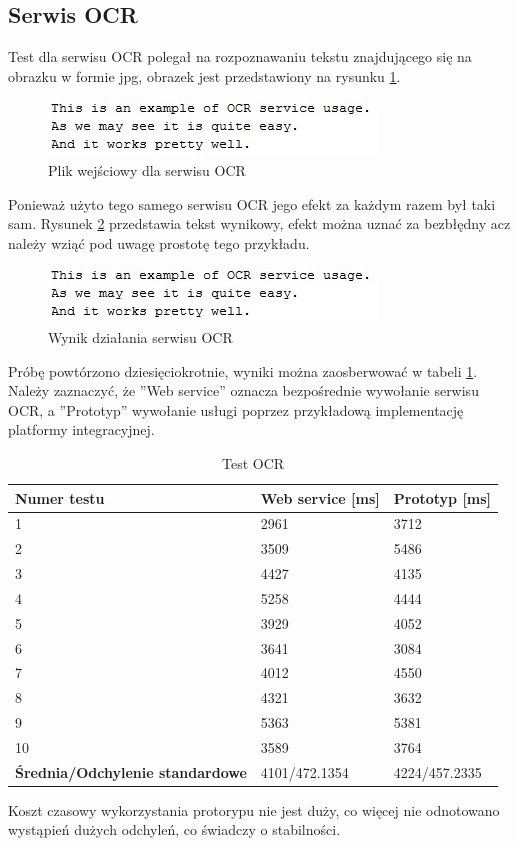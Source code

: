 \subsection{Serwis OCR}
Test dla serwisu OCR polegał na rozpoznawaniu tekstu znajdującego się na obrazku w formie jpg, obrazek jest przedstawiony na rysunku \ref{fig:OCRExample}. 
\begin{figure}[!h]
\centering
\includegraphics[scale=0.9]{OCRExample.jpg}
\caption{Plik wejściowy dla serwisu OCR}\label{fig:OCRExample}
\end{figure}
Ponieważ użyto tego samego serwisu OCR jego efekt za każdym razem był taki sam. Rysunek \ref{fig:OCRResult} przedstawia tekst wynikowy, efekt można uznać za bezbłędny acz należy wziąć pod uwagę prostotę tego przykładu.
\begin{figure}[!h]
\centering
\includegraphics[scale=0.9]{OCRExample.jpg}
\caption{Wynik działania serwisu OCR}\label{fig:OCRResult}
\end{figure}
Próbę powtórzono dziesięciokrotnie, wyniki można zaosberwować w tabeli \ref{fig:ocr}. Należy zaznaczyć, że ''Web service'' oznacza bezpośrednie wywołanie serwisu OCR, a ''Prototyp'' wywołanie usługi poprzez przykładową implementację platformy integracyjnej.
\begin{center}
	\begin{table}[h]
	\label{fig:ocr}
	\caption{Test OCR}
	\centering
	\begin{tabular}{| l | l | l |}	
		\hline
		\textbf{Numer testu} & \textbf{Web service [ms]} & \textbf{Prototyp [ms]} \\ \hline
		1 & 2961 & 3712\\ \hline
		2 & 3509 & 5486\\ \hline
		3 & 4427 & 4135\\ \hline
		4 & 5258 & 4444\\ \hline
		5 & 3929 & 4052\\ \hline
		6 & 3641 & 3084\\ \hline
		7 & 4012 & 4550\\ \hline
		8 & 4321 & 3632\\ \hline
		9 & 5363 & 5381\\ \hline
		10 & 3589 & 3764\\ \hline
		\textbf{Średnia/Odchylenie standardowe} & 4101/472.1354 & 4224/457.2335\\ 
		\hline
	\end{tabular}
	\end{table}
\end{center}
Koszt czasowy wykorzystania protorypu nie jest duży, co więcej nie odnotowano wystąpień dużych odchyleń, co świadczy o stabilności. 

